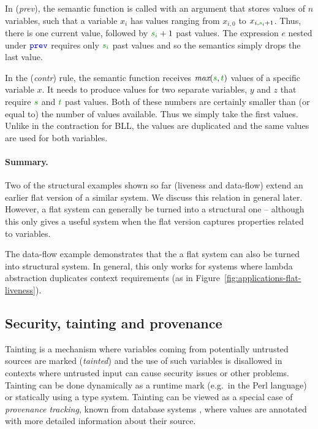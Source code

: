 %
In (\emph{prev}), the semantic function is called with an argument that stores values of $n$
variables, such that a variable $x_i$ has values ranging from $x_{i,0}$ to $x_{i,\cclrd{s}_i + 1}$.
Thus, there is one current value, followed by $\cclrd{s_i} + 1$ past values. The expression $e$
nested under $\kvd{prev}$ requires only $\cclrd{s_i}$ past values and so the semantics simply
drops the last value.

In the (\emph{contr}) rule, the semantic function receives $\emph{max}(\cclrd{s}, \cclrd{t})$ values
of a specific variable $x$. It needs to produce values for two separate variables, $y$ and $z$ that
require $\cclrd{s}$ and $\cclrd{t}$ past values. Both of these numbers are certainly smaller than 
(or equal to) the number of values available. Thus we simply take the first values. Unlike in the
contraction for BLL, the values are duplicated and the same values are used for both variables.

\paragraph{Summary.}
Two of the structural examples shown so far (liveness and data-flow) extend an earlier flat 
version of a similar system. We discuss this relation in general later. However, a flat system 
can generally be turned into a structural one -- although this only gives a useful system when
the flat version captures properties related to variables.

The data-flow example demonstrates that the a flat system can also be turned into structural 
system. In general, this only works for systems where lambda abstraction duplicates context
requirements (as in Figure~\ref{fig:applications-flat-liveness}). 


\subsection{Security, tainting and provenance}
Tainting is a mechanism where variables coming from potentially untrusted sources are marked
(\emph{tainted}) and the use of such variables is disallowed in contexts where untrusted input
can cause security issues or other problems. Tainting can be done dynamically as a runtime mark
(e.g.~in the Perl language) or statically using a type system. Tainting can be viewed as a special
case of \emph{provenance tracking}, known from database systems \cite{app-provenance-db}, where
values are annotated with more detailed information about their source.

